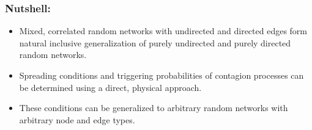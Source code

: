 \begin{frame}
  \frametitle{Nutshell:}
  
  \begin{itemize}
  \item<1->
    Mixed, correlated random networks with undirected and directed
    edges form natural inclusive generalization of
    purely undirected and purely directed random networks.
  \item<2->
    Spreading conditions and triggering probabilities
    of contagion processes can be determined using
    a direct, physical approach.
  \item<3->
    These conditions can be generalized to arbitrary random networks
    with arbitrary node and edge types.
  \end{itemize}
  
\end{frame}
